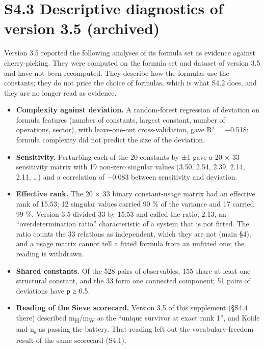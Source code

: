 \documentclass[11pt,a4paper]{article}
\begin{document}
\section{S4.3 Descriptive diagnostics of version 3.5 (archived)}\label{s4.3-descriptive-diagnostics-of-version-3.5-archived}

Version 3.5 reported the following analyses of its formula set as evidence against cherry-picking. They were computed on the formula set and dataset of version 3.5 and have not been recomputed. They describe how the formulas use the constants; they do not price the choice of formulas, which is what S4.2 does, and they are no longer read as evidence.

\begin{itemize}
\tightlist
\item
  \textbf{Complexity against deviation.} A random-forest regression of \textbar deviation\textbar{} on formula features (number of constants, largest constant, number of operations, sector), with leave-one-out cross-validation, gave R² = −0.518: formula complexity did not predict the size of the deviation.
\item
  \textbf{Sensitivity.} Perturbing each of the 20 constants by ±1 gave a 20 × 33 sensitivity matrix with 19 non-zero singular values (3.50, 2.54, 2.39, 2.14, 2.11, \ldots) and a correlation of −0.083 between sensitivity and deviation.
\item
  \textbf{Effective rank.} The 20 × 33 binary constant-usage matrix had an effective rank of 15.53; 12 singular values carried 90 \% of the variance and 17 carried 99 \%. Version 3.5 divided 33 by 15.53 and called the ratio, 2.13, an ``overdetermination ratio'' characteristic of a system that is not fitted. The ratio counts the 33 relations as independent, which they are not (main §4), and a usage matrix cannot tell a fitted formula from an unfitted one; the reading is withdrawn.
\item
  \textbf{Shared constants.} Of the 528 pairs of observables, 155 share at least one structural constant, and the 33 form one connected component; 51 pairs of deviations have \textbar ρ\textbar{} ≥ 0.5.
\item
  \textbf{Reading of the Sieve scorecard.} Version 3.5 of this supplement (§S4.4 there) described m\textsubscript{H}/m\textsubscript{W} as the ``unique survivor at exact rank 1'', and Koide and n\textsubscript{s} as passing the battery. That reading left out the vocabulary-freedom result of the same scorecard (S4.1).
\end{itemize}
\end{document}
